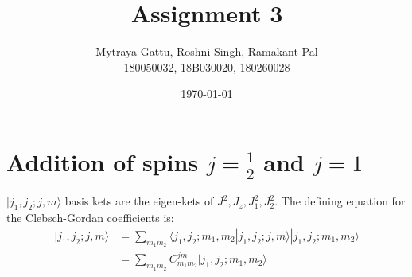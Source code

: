 \documentclass{article}
\title{Assignment 3}
\author{Mytraya Gattu, Roshni Singh, Ramakant Pal\\ 180050032, 18B030020, 180260028}
\date{\today}
\begin{document}
\maketitle
\section*{\textbf{Addition of spins $j=\frac{1}{2}$ and $j=1$}}
$|j_{1},j_{2};j,m\rangle$ basis kets are the eigen-kets of $J^2,J_{z},J_{1}^{2},J_{2}^{2}$. The defining equation for the Clebsch-Gordan coefficients is:
\begin{align*}
    |j_{1},j_{2};j,m\rangle & = \sum_{m_{1} m_{2}} \langle j_{1},j_{2}; m_{1},m_{2}|j_{1},j_{2};j,m\rangle | j_{1},j_{2};m_{1},m_{2} \rangle \\
    & = \sum_{m_{1} m_{2}} C^{jm}_{m_{1} m_{2}}| j_{1},j_{2};m_{1},m_{2} \rangle
\end{align*}
\end{document}
